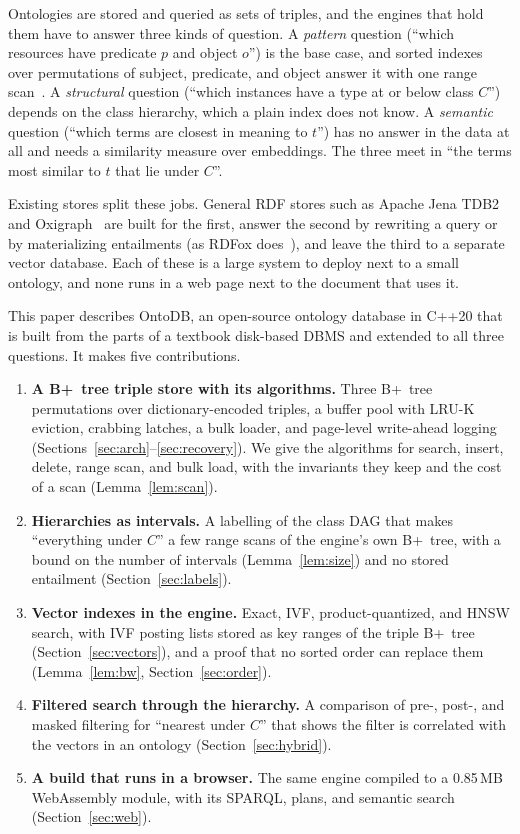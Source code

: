 \documentclass[sigconf, nonacm]{acmart}
\newcommand{\sys}{OntoDB}
\begin{document}
Ontologies are stored and queried as sets of triples, and the engines that hold them have to answer three kinds of question. A \emph{pattern} question (``which resources have predicate $p$ and object $o$'') is the base case, and sorted indexes over permutations of subject, predicate, and object answer it with one range scan~\cite{weiss2008,neumann2010}. A \emph{structural} question (``which instances have a type at or below class $C$'') depends on the class hierarchy, which a plain index does not know. A \emph{semantic} question (``which terms are closest in meaning to $t$'') has no answer in the data at all and needs a similarity measure over embeddings. The three meet in ``the terms most similar to $t$ that lie under $C$''.

Existing stores split these jobs. General RDF stores such as Apache Jena TDB2~\cite{jenatdb} and Oxigraph~\cite{oxigraph} are built for the first, answer the second by rewriting a query or by materializing entailments (as RDFox does~\cite{rdfox}), and leave the third to a separate vector database. Each of these is a large system to deploy next to a small ontology, and none runs in a web page next to the document that uses it.

This paper describes \sys{}, an open-source ontology database in C++20 that is built from the parts of a textbook disk-based DBMS and extended to all three questions. It makes five contributions.

\begin{enumerate}
\item \textbf{A B+~tree triple store with its algorithms.} Three B+~tree permutations over dictionary-encoded triples, a buffer pool with LRU-K eviction, crabbing latches, a bulk loader, and page-level write-ahead logging (Sections~\ref{sec:arch}--\ref{sec:recovery}). We give the algorithms for search, insert, delete, range scan, and bulk load, with the invariants they keep and the cost of a scan (Lemma~\ref{lem:scan}).
\item \textbf{Hierarchies as intervals.} A labelling of the class DAG that makes ``everything under $C$'' a few range scans of the engine's own B+~tree, with a bound on the number of intervals (Lemma~\ref{lem:size}) and no stored entailment (Section~\ref{sec:labels}).
\item \textbf{Vector indexes in the engine.} Exact, IVF, product-quantized, and HNSW search, with IVF posting lists stored as key ranges of the triple B+~tree (Section~\ref{sec:vectors}), and a proof that no sorted order can replace them (Lemma~\ref{lem:bw}, Section~\ref{sec:order}).
\item \textbf{Filtered search through the hierarchy.} A comparison of pre-, post-, and masked filtering for ``nearest under $C$'' that shows the filter is correlated with the vectors in an ontology (Section~\ref{sec:hybrid}).
\item \textbf{A build that runs in a browser.} The same engine compiled to a 0.85\,MB WebAssembly module, with its SPARQL, plans, and semantic search (Section~\ref{sec:web}).
\end{enumerate}
\end{document}
